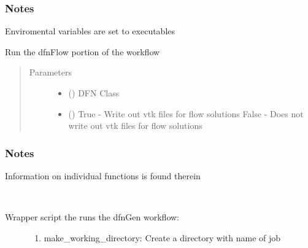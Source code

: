 \documentclass[letterpaper,10pt,english]{sphinxmanual}
\begin{document}
\begin{fulllineitems}
\begin{fulllineitems}
\subsubsection*{Notes}

Enviromental variables are set to executables

\end{fulllineitems}


\begin{fulllineitems}
\label{\detokenize{pydfnworks:pydfnworks.general.dfnworks.DFNWORKS.dfn_flow}}
Run the dfnFlow portion of the workflow
\begin{quote}\begin{description}
\item[{Parameters}] \leavevmode\begin{itemize}
\item {} 
 () \textendash{} DFN Class

\item {} 
 () \textendash{} True - Write out vtk files for flow solutions
False  - Does not write out vtk files for flow solutions

\end{itemize}

\end{description}\end{quote}
\subsubsection*{Notes}

Information on individual functions is found therein

\end{fulllineitems}


\begin{fulllineitems}
\label{\detokenize{pydfnworks:pydfnworks.general.dfnworks.DFNWORKS.dfn_gen}}~\begin{description}
\item[{Wrapper script the runs the dfnGen workflow:}] \leavevmode\begin{enumerate}
\def\theenumi{\arabic{enumi}}
\def\labelenumi{\theenumi )}
\makeatletter\def\p@enumii{\p@enumi \theenumi )}\makeatother
\item {} 
make\_working\_directory: Create a directory with name of job


\end{enumerate}
\end{description}
\end{fulllineitems}
\end{fulllineitems}
\end{document}
